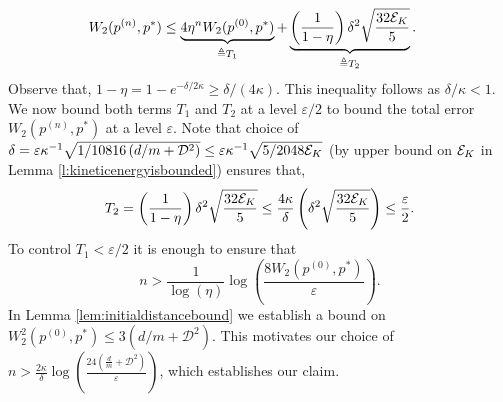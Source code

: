 \begin{Proof}
\begin{align}\label{eq:contractionmasterequation1}
W_2(p^{(n)}, p^*) & \le \underbrace{4\eta^{n}W_2(p^{(0)}, p^*)}_{\triangleq T_1}+ \underbrace{\left(\frac{1}{1-\eta}\right)\delta^2 \sqrt{\frac{32\mathcal{E}_K}{5}}}_{\triangleq T_2}.
\end{align}
Observe that, $1-\eta = 1-e^{-\delta/2\kappa}  \ge \delta/(4\kappa).$ This inequality follows as $ \delta/\kappa <1$. We now bound both terms $T_1$ and $T_2$ at a level $\varepsilon/2$ to bound the total error $W_2(p^{(n)},p^*)$ at a level $\varepsilon$. Note that choice of $\delta = \varepsilon \kappa^{-1} \sqrt{1/10816\left(d/m + \mathcal{D}^2 \right)} \le \varepsilon \kappa^{-1}  \sqrt{5 /2048 \mathcal{E}_K}$ (by upper bound on $\mathcal{E}_K$ in Lemma \ref{l:kineticenergyisbounded}) ensures that,
\begin{align*}
T_2 = \left(\frac{1}{1-\eta}\right)\delta^2 \sqrt{\frac{32\mathcal{E}_K}{5}} \le \frac{4\kappa}{ \delta}\left(\delta^2 \sqrt{\frac{32\mathcal{E}_K}{5}} \right) \le \frac{\varepsilon}{2}.
\end{align*}
To control $T_1< \varepsilon/2$ it is enough to ensure that $$n > \frac{1}{\log(\eta)} \log \left(\frac{8 W_2(p^{(0)},p^*)}{\varepsilon} \right).$$ In Lemma \ref{lem:initialdistancebound} we establish a bound on $W_2^2(p^{(0)},p^*) \le 3(d/m + \mathcal{D}^2)$. This motivates our choice of $n > \frac{2\kappa}{ \delta}\log\left( \frac{24 \left(\frac{d}{m}+ \mathcal{D}^2 \right)}{\varepsilon} \right)$, which establishes our claim.
\end{Proof}